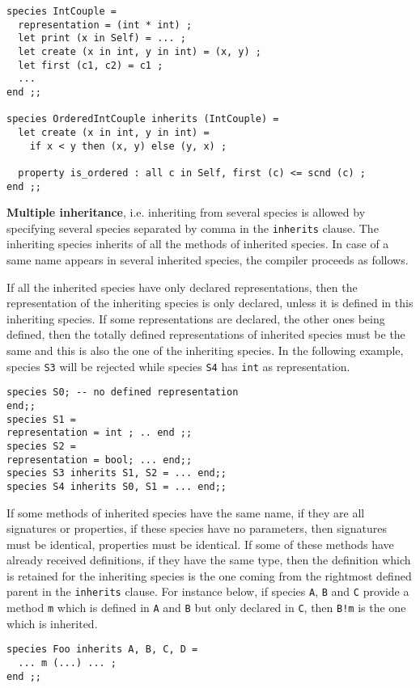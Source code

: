  {\scriptsize
\begin{lstlisting}
species IntCouple =
  representation = (int * int) ;
  let print (x in Self) = ... ;
  let create (x in int, y in int) = (x, y) ;
  let first (c1, c2) = c1 ; 
  ...
end ;;

species OrderedIntCouple inherits (IntCouple) =
  let create (x in int, y in int) =
    if x < y then (x, y) else (y, x) ;

  property is_ordered : all c in Self, first (c) <= scnd (c) ;
end ;;
\end{lstlisting}
}




\smallskip
{}
{\bf Multiple inheritance}, i.e. inheriting from several species is
allowed by specifying several species separated by comma in the
{\tt inherits} clause. The inheriting species inherits of all the
methods of inherited species. In case of a same name appears in
several inherited species, the compiler proceeds as follows. 

If all the inherited species have only declared representations, then
the representation of the inheriting species is only declared, unless
it is defined in this inheriting species. If some representations are
declared, the other ones being defined, then the totally defined
representations of inherited species must be the same and this is also
the one of the inheriting species. In the following example, species
{\tt S3} will be rejected while species {\tt S4} has {\tt int} as
representation.

{\scriptsize
\begin{lstlisting}
species S0; -- no defined representation
end;; 
species S1 =
representation = int ; .. end ;;
species S2 =
representation = bool; ... end;;
species S3 inherits S1, S2 = ... end;;
species S4 inherits S0, S1 = ... end;;
\end{lstlisting}
}

If some methods of inherited species have the same name, if they are
all signatures or properties, if these species have no parameters,
then signatures must be identical, properties must be identical. If
some of these methods have already received definitions, if they have
the same type, then the definition which is retained for the
inheriting species is the one coming from the rightmost defined parent
in the {\tt inherits} clause. For instance below, if species {\tt A},
{\tt B} 
and {\tt C} provide a method {\tt m} which is defined in {\tt A} and
{\tt B} but only declared in {\tt C}, then {\tt B!m} is the one which
is inherited.
{\scriptsize
\begin{lstlisting}
species Foo inherits A, B, C, D =
  ... m (...) ... ;
end ;;
\end{lstlisting}
}

